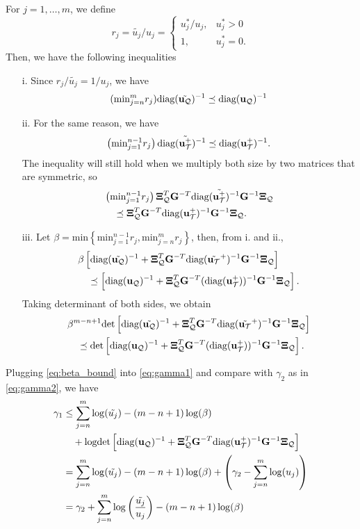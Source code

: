 \documentclass{article}
\begin{document}
For $j=1,\dots,m$, we define
\[
  r_j = \tilde{u_j}/u_j = \left\{\begin{array}{ll} u_j^*/u_j, & u_j^*>0 \\ 1, & u_j^*=0. \end{array}\right.
\]
Then, we have the following inequalities
\begin{itemize}
\item[i.] Since $r_j/\tilde{u_j}=1/u_j$, we have
\[
  (\text{min}_{j=n}^m r_j)\text{diag}(\tilde{{\bf u}_{\cal Q}})^{-1}\preceq\text{diag}({\bf u}_{\cal Q})^{-1}
\]
\item[ii.] For the same reason, we have
\[
  \left(\text{min}_{j=1}^{n-1} r_j\right)\text{diag}(\tilde{{\bf u}_{\cal T}^+})^{-1}\preceq\text{diag}({\bf u}_{\cal T}^+)^{-1}.
\]
The inequality will still hold when we multiply both size by two matrices that are symmetric, so
\begin{align*}
  &\left(\text{min}_{j=1}^{n-1} r_j\right) \hbox{\boldmath$\Xi$}_{\cal Q}^T{\bf G}^{-T} \text{diag}(\tilde{{\bf u}_{\cal T}^+})^{-1}{\bf G}^{-1}\hbox{\boldmath$\Xi$}_{\cal Q} \nonumber\\
  &\quad\preceq\hbox{\boldmath$\Xi$}_{\cal Q}^T{\bf G}^{-T}\text{diag}({\bf u}_{\cal T}^+)^{-1}{\bf G}^{-1}\hbox{\boldmath$\Xi$}_{\cal Q}.
\end{align*}

\item [iii.] Let $\beta=\text{min}\left\{\text{min}_{j=1}^{n-1} r_j,\text{min}_{j=n}^{m} r_j\right\}$, then, from i. and ii.,
\begin{align*}
  &\beta\left[\text{diag}(\tilde{{\bf u}_{\cal Q}})^{-1}+\hbox{\boldmath$\Xi$}_{\cal Q}^T{\bf G}^{-T}\text{diag}(\tilde{{\bf u}_{\cal T}}^+)^{-1}{\bf G}^{-1}\hbox{\boldmath$\Xi$}_{\cal Q}\right] \nonumber\\
  &\quad\preceq \left[\text{diag}({\bf u}_{\cal Q})^{-1}+\hbox{\boldmath$\Xi$}_{\cal Q}^T{\bf G}^{-T}(\text{diag}({\bf u}_{\cal T}^+))^{-1}{\bf G}^{-1}\hbox{\boldmath$\Xi$}_{\cal Q}\right].
\end{align*}
Taking determinant of both sides, we obtain
\begin{align}
\label{eq:beta_bound}
  &\beta^{m-n+1}{\hbox{det}}\left[\text{diag}(\tilde{{\bf u}_{\cal Q}})^{-1}+\hbox{\boldmath$\Xi$}_{\cal Q}^T{\bf G}^{-T}\text{diag}(\tilde{{\bf u}_{\cal T}}^+)^{-1}{\bf G}^{-1}\hbox{\boldmath$\Xi$}_{\cal Q}\right] \nonumber\\
  &\quad\preceq {\hbox{det}}\left[\text{diag}({\bf u}_{\cal Q})^{-1}+\hbox{\boldmath$\Xi$}_{\cal Q}^T{\bf G}^{-T}(\text{diag}({\bf u}_{\cal T}^+))^{-1}{\bf G}^{-1}\hbox{\boldmath$\Xi$}_{\cal Q}\right].
\end{align}
\end{itemize}
Plugging \eqref{eq:beta_bound} into \eqref{eq:gamma1} and compare with $\gamma_2$ as in \eqref{eq:gamma2}, we have
\begin{align}
  \gamma_1
  &\leq \sum_{j=n}^m \log(\tilde{u_j})-(m-n+1)\log(\beta)\nonumber\\
  &\quad +\text{logdet}\left[\text{diag}({\bf u}_{\cal Q})^{-1}+\hbox{\boldmath$\Xi$}_{\cal Q}^T{\bf G}^{-T}\text{diag}({\bf u}_{\cal T}^+)^{-1}{\bf G}^{-1}\hbox{\boldmath$\Xi$}_{\cal Q}\right]\nonumber\\
  &= \sum_{j=n}^m \log(\tilde{u_j})-(m-n+1)\log(\beta)+\left(\gamma_2-\sum_{j=n}^m \log(u_j)\right) \nonumber\\
  &= \gamma_2 + \sum_{j=n}^m \log\left(\frac{\tilde{u_j}}{u_j}\right)-(m-n+1)\log(\beta)
\end{align}
\end{document}
